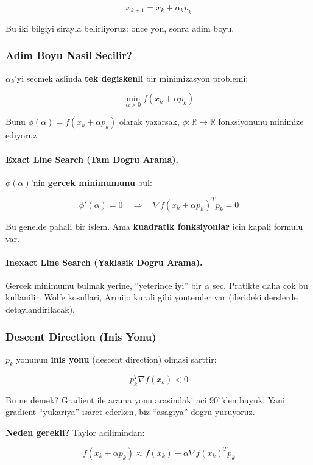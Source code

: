 \documentclass[12pt,a4paper]{article}
\theoremstyle{definition}
\theoremstyle{remark}
\begin{document}
\[
x_{k+1} = x_k + \alpha_k p_k
\]

Bu iki bilgiyi sirayla belirliyoruz: once yon, sonra adim boyu.

\subsubsection{Adim Boyu Nasil Secilir?}

$\alpha_k$'yi secmek aslinda \textbf{tek degiskenli} bir minimizasyon problemi:

\[
\min_{\alpha > 0} f(x_k + \alpha p_k)
\]

Bunu $\phi(\alpha) = f(x_k + \alpha p_k)$ olarak yazarsak, $\phi: \mathbb{R} \to \mathbb{R}$ fonksiyonunu minimize ediyoruz.

\paragraph{Exact Line Search (Tam Dogru Arama).}

$\phi(\alpha)$'nin \textbf{gercek minimumunu} bul:

\[
\phi'(\alpha) = 0 \quad \Rightarrow \quad \nabla f(x_k + \alpha p_k)^T p_k = 0
\]

Bu genelde pahali bir islem. Ama \textbf{kuadratik fonksiyonlar} icin kapali formulu var.

\paragraph{Inexact Line Search (Yaklasik Dogru Arama).}

Gercek minimumu bulmak yerine, ``yeterince iyi'' bir $\alpha$ sec. Pratikte daha cok bu kullanilir. Wolfe kosullari, Armijo kurali gibi yontemler var (ilerideki derslerde detaylandirilacak).

\subsubsection{Descent Direction (Inis Yonu)}

$p_k$ yonunun \textbf{inis yonu} (descent direction) olmasi sarttir:

\[
p_k^T \nabla f(x_k) < 0
\]

Bu ne demek? Gradient ile arama yonu arasindaki aci $90^\circ$'den buyuk. Yani gradient ``yukariya'' isaret ederken, biz ``asagiya'' dogru yuruyoruz.

\textbf{Neden gerekli?} Taylor acilimindan:

\[
f(x_k + \alpha p_k) \approx f(x_k) + \alpha \nabla f(x_k)^T p_k
\]
\end{document}
